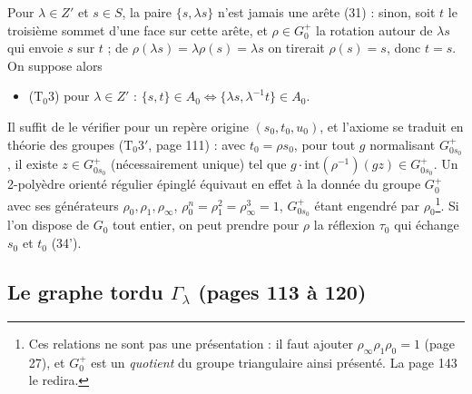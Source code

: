 \documentclass[11pt,a4paper]{article}
\begin{document}
Pour $\lambda \in Z'$ et $s \in S$, la paire $\{s, \lambda s\}$ n'est jamais une
arête (31) : sinon, soit $t$ le troisième sommet d'une face sur cette arête, et
$\rho \in G_0^{+}$ la rotation autour de $\lambda s$ qui envoie $s$ sur $t$ ;
de $\rho(\lambda s) = \lambda \rho(s) = \lambda s$ on tirerait $\rho(s) = s$,
donc $t = s$. On suppose alors
\begin{itemize}
  \item ($\mathrm{T}_0 3$) pour $\lambda \in Z'$ : $\{s, t\} \in A_0 \iff
    \{\lambda s, \lambda^{-1} t\} \in A_0$.
\end{itemize}
Il suffit de le vérifier pour un repère origine $(s_0, t_0, u_0)$, et l'axiome
se traduit en théorie des groupes ($\mathrm{T}_0 3'$, page 111) : avec $t_0 =
\rho s_0$, pour tout $g$ normalisant $G^{+}_{0 s_0}$, il existe $z \in G^{+}_{0
s_0}$ (nécessairement unique) tel que $g \cdot \mathrm{int}(\rho^{-1})(gz) \in
G^{+}_{0s_0}$. Un 2-polyèdre orienté régulier épinglé équivaut en effet à la
donnée du groupe $G_0^{+}$ avec ses générateurs $\rho_0, \rho_1, \rho_\infty$,
$\rho_0^n = \rho_1^2 = \rho_\infty^3 = 1$, $G^{+}_{0 s_0}$ étant engendré par
$\rho_0$\footnote{Ces relations ne sont pas une présentation : il faut ajouter
$\rho_\infty\rho_1\rho_0 = 1$ (page 27), et $G_0^{+}$ est un \emph{quotient} du
groupe triangulaire ainsi présenté. La page 143 le redira.}. Si l'on dispose de
$G_0$ tout entier, on peut prendre pour $\rho$ la réflexion $\tau_0$ qui échange
$s_0$ et $t_0$ (34').

\subsection*{Le graphe tordu $\Gamma_\lambda$ (pages 113 à 120)}
\end{document}
